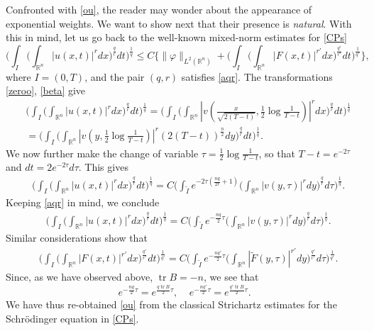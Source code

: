 \documentclass[11pt,letter]{amsart}
\def \vf{\varphi}
\newcommand{\Rn}{\mathbb R^n}
\numberwithin{equation}{section}
\newcommand{\tr}{\operatorname{tr}}
\numberwithin{equation}{section}
\begin{document}
Confronted with \eqref{ou}, the reader may wonder about the appearance of exponential weights. We want to show next that their presence is \emph{natural}. With this in mind, let us go back to the well-known mixed-norm estimates for \eqref{CPs} 
\begin{equation}\label{ginvel}
\bigg(\int_I \big(\int_{\Rn}|u(x,t)|^r dx\big)^{\frac qr} dt\bigg)^{\frac 1q} \le C \bigg\{\|\vf\|_{L^2(\Rn)}
 + \bigg(\int_I \big(\int_{\Rn}|F(x,t)|^{r'} dx\big)^{\frac{q'}{r'}} dt\bigg)^{\frac 1{q'}}\bigg\},
\end{equation}
where $I = (0,T)$, and the pair $(q,r)$ satisfies \eqref{aqr}. The transformations \eqref{zeroo}, \eqref{beta} give
\begin{align*}
& \bigg(\int_I \big(\int_{\Rn}|u(x,t)|^r dx\big)^{\frac qr} dt\bigg)^{\frac 1q} = \bigg(\int_I \big(\int_{\Rn}|v(\frac{x}{\sqrt{2(T-t)}},\frac 12 \log \frac{1}{T-t})|^r dx\big)^{\frac qr} dt\bigg)^{\frac 1q}
\\
&  = \bigg(\int_I \big(\int_{\Rn}|v(y,\frac 12 \log \frac{1}{T-t})|^r (2(T-t))^{\frac n2} dy\big)^{\frac qr} dt\bigg)^{\frac 1q}.
\end{align*}
We now further make the change of variable $\tau = \frac 12 \log \frac{1}{T-t}$, so that $T-t = e^{-2\tau}$ and $dt = 2 e^{-2\tau} d\tau$. This gives
\begin{align*}
& \bigg(\int_I \big(\int_{\Rn}|u(x,t)|^r dx\big)^{\frac qr} dt\bigg)^{\frac 1q} = C \bigg(\int_{\tilde I} e^{-2\tau(\frac{nq}{2r}+1)} \big(\int_{\Rn}|v(y,\tau)|^r dy\big)^{\frac qr} d\tau\bigg)^{\frac 1q}.
\end{align*}
Keeping \eqref{aqr} in mind, we conclude
\begin{align*}
& \bigg(\int_I \big(\int_{\Rn}|u(x,t)|^r dx\big)^{\frac qr} dt\bigg)^{\frac 1q} = C \bigg(\int_{\tilde I} e^{-\frac{nq}{2}\tau} \big(\int_{\Rn}|v(y,\tau)|^r dy\big)^{\frac qr} d\tau\bigg)^{\frac 1q}.
\end{align*}
Similar considerations show that
\begin{align*}
& \bigg(\int_I \big(\int_{\Rn}|F(x,t)|^{r'} dx\big)^{\frac{q'}{r'}} dt\bigg)^{\frac 1{q'}} = C 
  \bigg(\int_{\tilde I} e^{-\frac{nq'}{2}\tau } \big(\int_{\Rn}|\tilde F(y,\tau)|^{r'} dy\big)^{\frac{q'}{r'}} d\tau\bigg)^{\frac 1{q'}}.
\end{align*}
Since, as we have observed above, $\tr B = - n$, 
we see that  
\[
e^{-\frac{nq}{2}\tau }  = e^{\frac{q\tr B}2 \tau},\ \ \ \ \ e^{-\frac{nq'}{2}\tau } = e^{\frac{q'\tr B}2 \tau}. 
\]
We have thus re-obtained \eqref{ou} from the  classical  Strichartz estimates for the Schr\"odinger equation in \eqref{CPs}.
\end{document}
